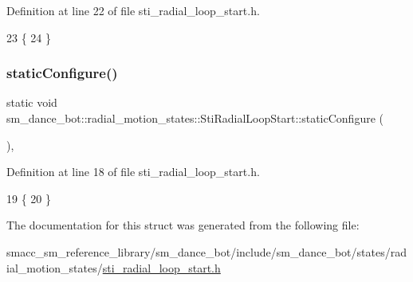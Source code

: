 Definition at line 22 of file sti\+\_\+radial\+\_\+loop\+\_\+start.\+h.


\begin{DoxyCode}
23   \{
24   \}
\end{DoxyCode}
\mbox{\label{structsm__dance__bot_1_1radial__motion__states_1_1StiRadialLoopStart_a5ff99328ae5482be3b666166f9ca769b}} 
\subsubsection{\texorpdfstring{static\+Configure()}{staticConfigure()}}
{\footnotesize\ttfamily static void sm\+\_\+dance\+\_\+bot\+::radial\+\_\+motion\+\_\+states\+::\+Sti\+Radial\+Loop\+Start\+::static\+Configure (\begin{DoxyParamCaption}{ }\end{DoxyParamCaption})\hspace{0.3cm}{\ttfamily [inline]}, {\ttfamily [static]}}



Definition at line 18 of file sti\+\_\+radial\+\_\+loop\+\_\+start.\+h.


\begin{DoxyCode}
19   \{
20   \}
\end{DoxyCode}


The documentation for this struct was generated from the following file\+:\begin{DoxyCompactItemize}
\item 
smacc\+\_\+sm\+\_\+reference\+\_\+library/sm\+\_\+dance\+\_\+bot/include/sm\+\_\+dance\+\_\+bot/states/radial\+\_\+motion\+\_\+states/\hyperlink{include_2sm__dance__bot_2states_2radial__motion__states_2sti__radial__loop__start_8h}{sti\+\_\+radial\+\_\+loop\+\_\+start.\+h}\end{DoxyCompactItemize}
